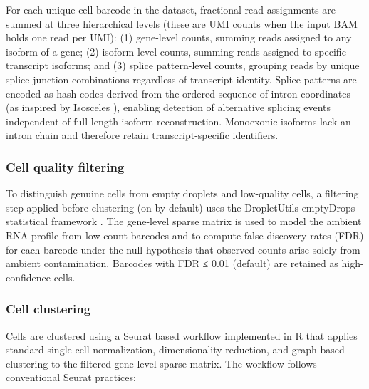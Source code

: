 For each unique cell barcode in the dataset, fractional read assignments are summed at three hierarchical levels (these are UMI counts when the input BAM holds one read per UMI): (1) gene-level counts, summing reads assigned to any isoform of a gene; (2) isoform-level counts, summing reads assigned to specific transcript isoforms; and (3) splice pattern-level counts, grouping reads by unique splice junction combinations regardless of transcript identity. Splice patterns are encoded as hash codes derived from the ordered sequence of intron coordinates (as inspired by Isosceles \citealp{kabza2024}), enabling detection of alternative splicing events independent of full-length isoform reconstruction. Monoexonic isoforms lack an intron chain and therefore retain transcript-specific identifiers.

\subsubsection{Cell quality filtering}\label{cell-quality-filtering}

To distinguish genuine cells from empty droplets and low-quality cells, a filtering step applied before clustering (on by default) uses the DropletUtils emptyDrops statistical framework \citep{lun2019}. The gene-level sparse matrix is used to model the ambient RNA profile from low-count barcodes and to compute false discovery rates (FDR) for each barcode under the null hypothesis that observed counts arise solely from ambient contamination. Barcodes with FDR ≤ 0.01 (default) are retained as high-confidence cells.

\subsubsection{Cell clustering}\label{cell-clustering}

Cells are clustered using a Seurat \citep{hao2024} based workflow implemented in R that applies standard single-cell normalization, dimensionality reduction, and graph-based clustering to the filtered gene-level sparse matrix. The workflow follows conventional Seurat practices:

